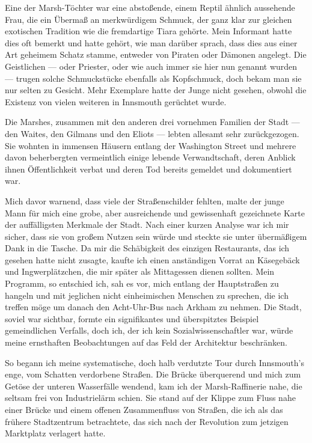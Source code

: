 Eine der Marsh-Töchter war eine  abstoßende, einem Reptil ähnlich aussehende Frau, die ein Übermaß an merkwürdigem Schmuck, der ganz klar zur gleichen exotischen Tradition wie die fremdartige Tiara gehörte. Mein Informant hatte dies oft bemerkt und hatte gehört, wie man darüber sprach, dass dies aus einer Art geheimem Schatz stamme, entweder von Piraten oder Dämonen angelegt. Die Geistlichen --- oder Priester, oder wie auch immer sie hier nun genannt wurden --- trugen solche Schmuckstücke ebenfalls als Kopfschmuck, doch bekam man sie nur selten zu Gesicht. Mehr Exemplare hatte der Junge nicht gesehen, obwohl die Existenz von vielen weiteren in Innsmouth gerüchtet wurde.

Die Marshes, zusammen mit den anderen drei vornehmen Familien der Stadt --- den Waites, den Gilmans und den Eliots --- lebten allesamt sehr zurückgezogen. Sie wohnten in immensen Häusern entlang der Washington Street und mehrere davon beherbergten vermeintlich einige lebende Verwandtschaft, deren Anblick ihnen Öffentlichkeit verbat und deren Tod bereits gemeldet und dokumentiert war. 

Mich davor warnend, dass viele der Straßenschilder fehlten, malte der junge Mann für mich eine grobe, aber ausreichende und gewissenhaft gezeichnete Karte der auffälligsten Merkmale der Stadt. Nach einer kurzen Analyse war ich mir sicher, dass sie von großem Nutzen sein würde und steckte sie unter übermäßigem Dank in die Tasche. Da mir die Schäbigkeit des einzigen Restaurants, das ich gesehen hatte nicht zusagte, kaufte ich einen anständigen Vorrat an Käsegebäck und Ingwerplätzchen, die mir später als Mittagessen dienen sollten. Mein Programm, so entschied ich, sah es vor, mich entlang der Hauptstraßen zu hangeln und mit jeglichen nicht einheimischen Menschen zu sprechen, die ich treffen möge um danach den Acht-Uhr-Bus nach Arkham zu nehmen. Die Stadt, soviel war sichtbar, formte ein signifikantes und überspitztes Beispiel gemeindlichen Verfalls, doch ich, der ich kein Sozialwissenschaftler war, würde meine ernsthaften Beobachtungen auf das Feld der Architektur beschränken.

So begann ich meine systematische, doch halb verdutzte Tour durch Innsmouth's enge, vom Schatten verdorbene Straßen. Die Brücke überquerend und mich zum Getöse der unteren Wasserfälle wendend, kam ich der Marsh-Raffinerie nahe, die seltsam frei von Industrielärm schien. Sie stand auf der Klippe zum Fluss nahe einer Brücke und einem offenen Zusammenfluss von Straßen, die ich als das frühere Stadtzentrum betrachtete, das  sich nach der Revolution zum jetzigen Marktplatz verlagert hatte.

